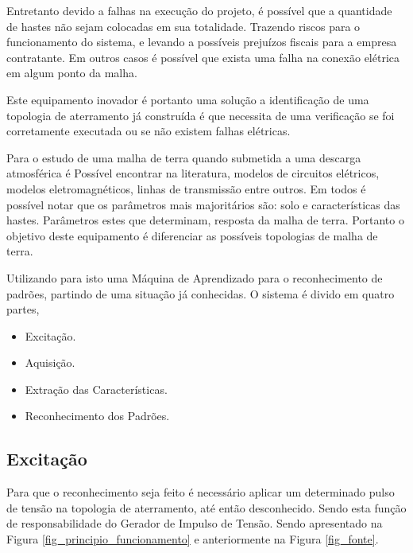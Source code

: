 \documentclass[a4paper, 10pt]{article}
\begin{document}
Entretanto devido a falhas na execução do projeto, é possível que a quantidade
de hastes não sejam colocadas em sua totalidade. Trazendo riscos para o 
funcionamento do sistema, e levando a possíveis prejuízos fiscais para a 
empresa contratante. Em outros casos é possível que exista uma falha na 
conexão elétrica em algum ponto da malha.

Este equipamento inovador é portanto uma solução a identificação de uma topologia
de aterramento já construída é que necessita de uma verificação se foi corretamente
executada ou se não existem falhas elétricas.

Para o estudo de uma malha de terra quando submetida a uma descarga atmosférica 
é Possível encontrar na literatura, modelos de circuitos elétricos, modelos 
eletromagnéticos, linhas de transmissão entre outros. Em todos é possível notar 
que os parâmetros mais majoritários são: solo e características das hastes. 
Parâmetros estes que determinam, resposta da malha de terra. Portanto o objetivo
deste equipamento é diferenciar as possíveis topologias de malha de terra. 

Utilizando para isto uma Máquina de Aprendizado para o reconhecimento de padrões, 
partindo de uma situação já conhecidas. O sistema é divido em quatro partes, 

\begin{itemize}
    \item Excitação.
    \item Aquisição.
    \item Extração das Características.
    \item Reconhecimento dos Padrões.
\end{itemize}

\subsection{Excitação}

Para que o reconhecimento seja feito é necessário aplicar um determinado pulso
de tensão na topologia de aterramento, até então desconhecido. 
Sendo esta função de responsabilidade do Gerador de Impulso de Tensão. 
Sendo apresentado na Figura \ref{fig_principio_funcionamento} e 
anteriormente na Figura \ref{fig_fonte}.
\end{document}
